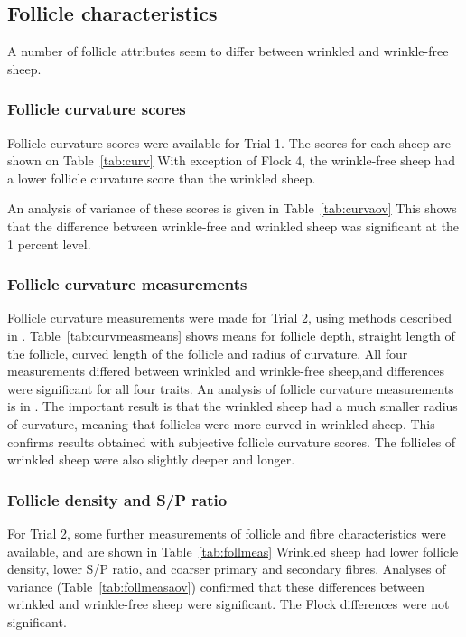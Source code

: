 \documentclass{article}
\begin{document}
\subsection{Follicle characteristics}
A number of follicle attributes seem to differ between wrinkled and wrinkle-free sheep. 

\subsubsection{Follicle curvature scores}
Follicle curvature scores were available for Trial 1. The scores for each sheep are shown on Table~\ref{tab:curv}
%
With exception of Flock 4, the wrinkle-free sheep had a lower follicle curvature score than the wrinkled sheep.

An analysis of variance of these scores is given in Table~\ref{tab:curvaov}
%
This shows that the difference between wrinkle-free and wrinkled sheep was significant at the 1 percent level.

\subsubsection{Follicle curvature measurements}
Follicle curvature measurements were made for Trial 2, using methods described in \cite{watts-2018}.  Table~\ref{tab:curvmeasmeans} shows means for follicle depth, straight length of the follicle, curved length of the follicle and radius of curvature. 
%
All four measurements differed between wrinkled and wrinkle-free sheep,and differences were significant for all four traits.  An analysis of follicle curvature measurements is in \cite{watts-2018}. 
The important result is that the wrinkled sheep had a much smaller radius of curvature, meaning that follicles were more curved in wrinkled sheep. This confirms results obtained with subjective follicle curvature scores.  The follicles of wrinkled sheep were also slightly deeper and longer. 

\subsubsection{Follicle density and S/P ratio}
For Trial 2, some further measurements of follicle and fibre characteristics were available, and are shown in Table~\ref{tab:follmeas}
%
Wrinkled sheep had lower follicle density, lower S/P ratio, and coarser primary and secondary fibres.  Analyses of variance (Table~\ref{tab:follmeasaov}) confirmed that these differences between wrinkled and wrinkle-free sheep were significant. The Flock differences were not significant.
%
\end{document}
